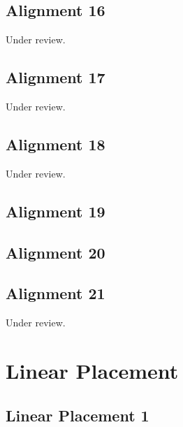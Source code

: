 \documentclass{scrartcl}
\begin{document}
\subsection{Alignment 16} %
\label{sec:align_16}
Under review.%
\clearpage

\subsection{Alignment 17} %
\label{sec:align_17}
Under review.%
\clearpage

\subsection{Alignment 18} %
\label{sec:align_18}
Under review.%
\clearpage

\subsection{Alignment 19} %
\label{sec:align_19}
\clearpage

\subsection{Alignment 20} %
\label{sec:align_20}
\clearpage

\subsection{Alignment 21} %
\label{sec:align_21}
Under review.%
\clearpage

\section{Linear Placement}
\label{sec:linear_placement}

\subsection{Linear Placement 1} 
\label{sec:linear_1}
\clearpage
\end{document}
